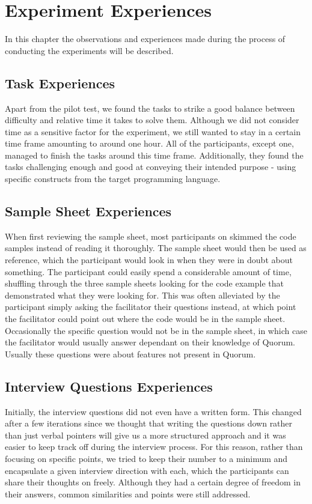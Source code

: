 \chapter{Experiment Experiences}
In this chapter the observations and experiences made during the process of conducting the experiments will be described.

\section{Task Experiences}
Apart from the pilot test, we found the tasks to strike a good balance between difficulty and relative time it takes to solve them. Although we did not consider time as a sensitive factor for the experiment, we still wanted to stay in a certain time frame amounting to around one hour. All of the participants, except one, managed to finish the tasks around this time frame. Additionally, they found the tasks challenging enough and good at conveying their intended purpose - using specific constructs from the target programming language. 

\section{Sample Sheet Experiences}
When first reviewing the sample sheet, most participants on skimmed the code samples instead of reading it thoroughly. The sample sheet would then be used as reference, which the participant would look in when they were in doubt about something. The participant could easily spend a considerable amount of time, shuffling through the three sample sheets looking for the code example that demonstrated what they were looking for. This was often alleviated by the participant simply asking the facilitator their questions instead, at which point the facilitator could point out where the code would be in the sample sheet. Occasionally the specific question would not be in the sample sheet, in which case the facilitator would usually answer dependant on their knowledge of Quorum. Usually these questions were about features not present in Quorum.

\section{Interview Questions Experiences}
Initially, the interview questions did not even have a written form. This changed after a few iterations since we thought that writing the questions down rather than just verbal pointers will give us a more structured approach and it was easier to keep track off during the interview process. For this reason, rather than focusing on specific points, we tried to keep their number to a minimum and encapsulate a given interview direction with each, which the participants can share their thoughts on freely. Although they had a certain degree of freedom in their answers, common similarities and points were still addressed. 